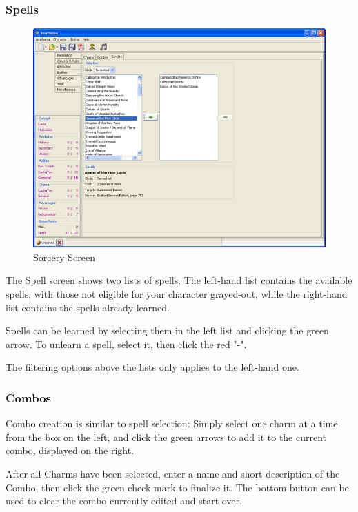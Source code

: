 \subsubsection{Spells}
\begin{figure}
	\centering
		\includegraphics[width=1.00\textwidth]{images/Spells.png}
	\caption{Sorcery Screen}
	\label{fig:Spells}
\end{figure}

The Spell screen shows two lists of spells. The left-hand list contains the available spells, with those not eligible for your character grayed-out, while the right-hand list contains the spells already learned.

Spells can be learned by selecting them in the left list and clicking the green arrow. To unlearn a spell, select it, then click the red "-". 

The filtering options above the lists only applies to the left-hand one.


\subsubsection{Combos}
Combo creation is similar to spell selection: Simply select one charm at a time from the box on the left, and click the green arrows to add it to the current combo, displayed on the right. 

After all Charms have been selected, enter a name and short description of the Combo, then click the green check mark to finalize it. The bottom button can be used to clear the combo currently edited and start over. 

